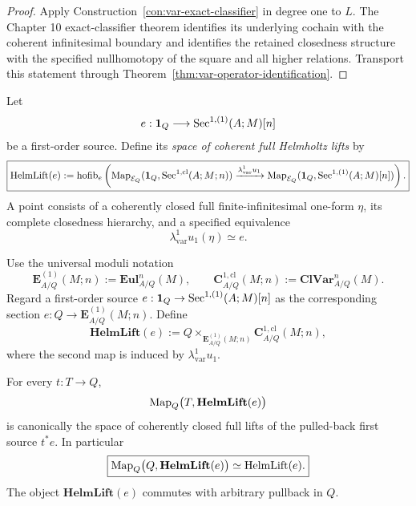\begin{proof}
Apply Construction~\ref{con:var-exact-classifier} in degree one to \(L\). The Chapter 10 exact-classifier theorem identifies its underlying cochain with the coherent infinitesimal boundary and identifies the retained closedness structure with the specified nullhomotopy of the square and all higher relations. Transport this statement through Theorem~\ref{thm:var-operator-identification}.
\end{proof}

\begin{definition}
\label{def:var-helmholtz-lift}
Let
\[
    e:\mathbf 1_Q\longrightarrow\operatorname{Sec}^{1,(1)}(A;M)[n]
\]
be a first-order source. Define its \emph{space of coherent full Helmholtz lifts} by
\[
    \boxed{
    \operatorname{HelmLift}(e)
    :=
    \operatorname{hofib}_e\left(
      \operatorname{Map}_{\mathcal E_Q}
      (\mathbf 1_Q,\operatorname{Sec}^{1,\mathrm{cl}}(A;M;n))
      \xrightarrow{\lambda^1_{\mathrm{var}}u_1}
      \operatorname{Map}_{\mathcal E_Q}
      (\mathbf 1_Q,\operatorname{Sec}^{1,(1)}(A;M)[n])
    \right).
    }
\]
A point consists of a coherently closed full finite-infinitesimal one-form \(\eta\), its complete closedness hierarchy, and a specified equivalence
\[
    \lambda^1_{\mathrm{var}}u_1(\eta)\simeq e.
\]
\end{definition}

\begin{definition}
\label{def:var-parameterized-helmholtz-lift}
Use the universal moduli notation
\[
    \mathbf E^{(1)}_{A/Q}(M;n)
    :=
    \mathbf{Eul}^n_{A/Q}(M),
    \qquad
    \mathbf C^{1,\mathrm{cl}}_{A/Q}(M;n)
    :=
    \mathbf{ClVar}^n_{A/Q}(M).
\]
Regard a first-order source
\(
 e:\mathbf 1_Q\to\operatorname{Sec}^{1,(1)}(A;M)[n]
\)
as the corresponding section
\(e:Q\to\mathbf E^{(1)}_{A/Q}(M;n)\). Define
\[
    \boxed{
    \mathbf{HelmLift}(e)
    :=
    Q
    \times_{\mathbf E^{(1)}_{A/Q}(M;n)}
    \mathbf C^{1,\mathrm{cl}}_{A/Q}(M;n),
    }
\]
where the second map is induced by \(\lambda^1_{\mathrm{var}}u_1\).
\end{definition}

\begin{proposition}
\label{prop:var-parameterized-helmholtz-lift}
For every \(t:T\to Q\),
\[
    \operatorname{Map}_Q\bigl(T,\mathbf{HelmLift}(e)\bigr)
\]
is canonically the space of coherently closed full lifts of the pulled-back first source \(t^*e\). In particular
\[
    \boxed{
    \operatorname{Map}_Q\bigl(Q,\mathbf{HelmLift}(e)\bigr)
    \simeq
    \operatorname{HelmLift}(e).
    }
\]
The object \(\mathbf{HelmLift}(e)\) commutes with arbitrary pullback in \(Q\).
\end{proposition}

